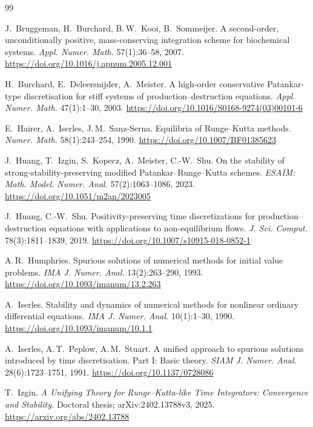 \documentclass[11pt,a4paper]{article}
\theoremstyle{plain}
\theoremstyle{definition}
\begin{document}
\begingroup\small
\begin{thebibliography}{99}
\setlength{\itemsep}{2pt}\setlength{\parsep}{0pt}

J.~Bruggeman, H.~Burchard, B.\,W.~Kooi, B.~Sommeijer.
A second-order, unconditionally positive, mass-conserving integration scheme for biochemical systems.
\emph{Appl. Numer. Math.} 57(1):36--58, 2007.
\url{https://doi.org/10.1016/j.apnum.2005.12.001}

H.~Burchard, E.~Deleersnijder, A.~Meister.
A high-order conservative Patankar-type discretisation for stiff systems of production--destruction equations.
\emph{Appl. Numer. Math.} 47(1):1--30, 2003.
\url{https://doi.org/10.1016/S0168-9274(03)00101-6}

E.~Hairer, A.~Iserles, J.\,M.~Sanz-Serna.
Equilibria of Runge--Kutta methods.
\emph{Numer. Math.} 58(1):243--254, 1990.
\url{https://doi.org/10.1007/BF01385623}

J.~Huang, T.~Izgin, S.~Kopecz, A.~Meister, C.-W.~Shu.
On the stability of strong-stability-preserving modified Patankar--Runge--Kutta schemes.
\emph{ESAIM: Math. Model. Numer. Anal.} 57(2):1063--1086, 2023.
\url{https://doi.org/10.1051/m2an/2023005}

J.~Huang, C.-W.~Shu.
Positivity-preserving time discretizations for production--destruction equations with applications to non-equilibrium flows.
\emph{J. Sci. Comput.} 78(3):1811--1839, 2019.
\url{https://doi.org/10.1007/s10915-018-0852-1}

A.\,R.~Humphries.
Spurious solutions of numerical methods for initial value problems.
\emph{IMA J. Numer. Anal.} 13(2):263--290, 1993.
\url{https://doi.org/10.1093/imanum/13.2.263}

A.~Iserles.
Stability and dynamics of numerical methods for nonlinear ordinary differential equations.
\emph{IMA J. Numer. Anal.} 10(1):1--30, 1990.
\url{https://doi.org/10.1093/imanum/10.1.1}

A.~Iserles, A.\,T.~Peplow, A.\,M.~Stuart.
A unified approach to spurious solutions introduced by time discretisation. Part I: Basic theory.
\emph{SIAM J. Numer. Anal.} 28(6):1723--1751, 1991.
\url{https://doi.org/10.1137/0728086}

T.~Izgin.
\emph{A Unifying Theory for Runge--Kutta-like Time Integrators: Convergence and Stability.}
Doctoral thesis; arXiv:2402.13788v3, 2025.
\url{https://arxiv.org/abs/2402.13788}


\end{thebibliography}
\end{document}

